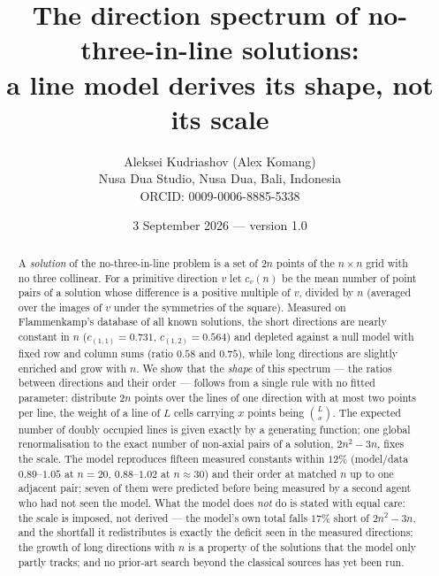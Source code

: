 \documentclass[11pt,a4paper]{article}
\title{The direction spectrum of no-three-in-line solutions:\\ a line model derives its shape, not its scale}
\author{Aleksei Kudriashov (Alex Komang)\\ \small Nusa Dua Studio, Nusa Dua, Bali, Indonesia\\ \small ORCID: 0009-0006-8885-5338}
\date{3 September 2026 --- version 1.0}
\begin{document}
\maketitle
\begin{abstract}
A \emph{solution} of the no-three-in-line problem is a set of $2n$ points of the $n\times n$ grid with no three
collinear.  For a primitive direction $v$ let $c_v(n)$ be the mean number of point pairs of a solution whose
difference is a positive multiple of $v$, divided by $n$ (averaged over the images of $v$ under the symmetries of
the square).  Measured on Flammenkamp's database of all known solutions, the short directions are nearly constant in
$n$ ($c_{(1,1)}=0.731$, $c_{(1,2)}=0.564$) and depleted against a null model with fixed row and column sums
(ratio $0.58$ and $0.75$), while long directions are slightly enriched and grow with $n$.  We show that the
\emph{shape} of this spectrum --- the ratios between directions and their order --- follows from a single rule with
no fitted parameter: distribute $2n$ points over the lines of one direction with at most two points per line, the
weight of a line of $L$ cells carrying $x$ points being $\binom{L}{x}$.  The expected number of doubly occupied lines
is given exactly by a generating function; one global renormalisation to the exact number of non-axial pairs of a
solution, $2n^2-3n$, fixes the scale.  The model reproduces fifteen measured constants within $12\%$ (model$/$data $0.89$--$1.05$ at $n=20$,
$0.88$--$1.02$ at $n\approx30$) and their order at matched $n$ up to one adjacent pair; seven of them were predicted before being measured by a second agent who had not seen the
model.  What the model does \emph{not} do is stated with equal care: the scale is imposed, not derived --- the
model's own total falls $17\%$ short of $2n^2-3n$, and the shortfall it redistributes is exactly the deficit seen in the
measured directions; the growth of long directions with $n$ is a property of the solutions that the model only
partly tracks; and no prior-art search beyond the classical sources has yet been run.
\end{abstract}
\end{document}

